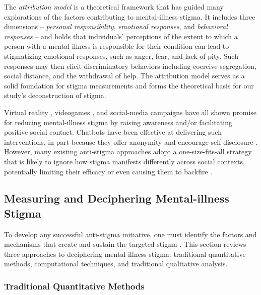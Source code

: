 The \textit{attribution model} \cite{attribution_model_corrigan_2003} is a theoretical framework that has guided many explorations of the factors contributing to mental-illness stigma. 
It includes three dimensions – \textit{personal responsibility}, \textit{emotional responses}, and \textit{behavioral responses} – and holds that individuals' perceptions of the extent to which a person with a mental illness is responsible for their condition can lead to stigmatizing emotional responses, such as anger, fear, and lack of pity. 
Such responses may then elicit discriminatory behaviors including coercive segregation, social distance, and the withdrawal of help. 
The attribution model serves as a solid foundation for stigma measurements and forms the theoretical basis for our study's deconstruction of stigma.


Virtual reality \cite{realtime_martinez_2024}, videogames \cite{personalized_anvari_2024}, and social-media campaigns \cite{reduce_sm_feuston_2019} have all shown promise for reducing mental-illness stigma by raising awareness and/or facilitating positive social contact. 
Chatbots have been effective at delivering such interventions, in part because they offer anonymity and encourage self-disclosure \cite{chatbot_reduce_kim_2020, disclosure_lee_2022, chatbot_aq27_practice_lee_2023}. 
However, many existing anti-stigma approaches adopt a one-size-fits-all strategy that is likely to ignore how stigma manifests differently across social contexts, potentially limiting their efficacy or even causing them to backfire \cite{backfire_dobson_2022}.



\subsection{Measuring and Deciphering Mental-illness Stigma}

To develop any successful anti-stigma initiative, one must identify the factors and mechanisms that create and sustain the targeted stigma \cite{vignette_link_1987}.
This section reviews three approaches to deciphering mental-illness stigma: traditional quantitative methods, computational techniques, and traditional qualitative analysis.


\subsubsection{Traditional Quantitative Methods} %


